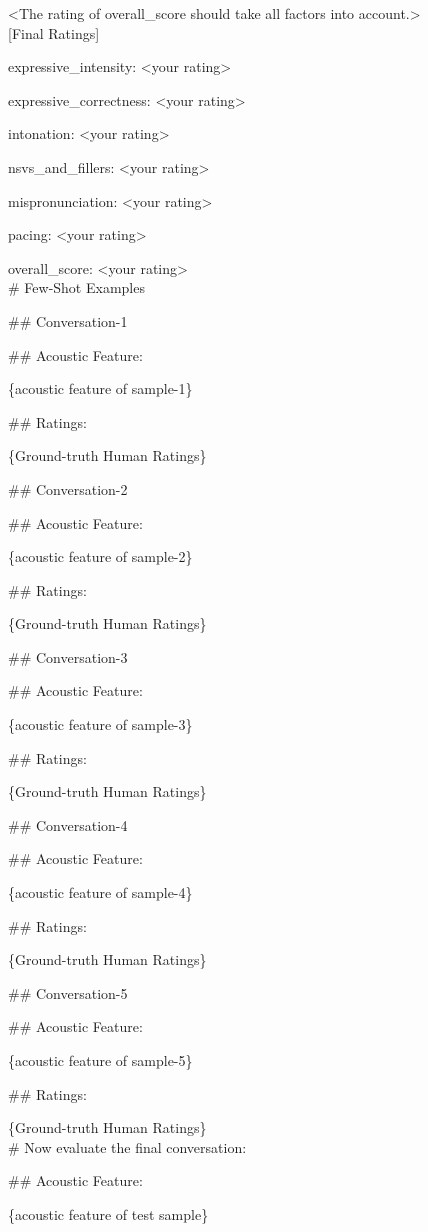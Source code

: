 \begin{tcolorbox}[gray_box, title = {{Prompt Template: Few-shot Acoustic Feature Prompting}}]
<The rating of overall_score should take all factors into account.> \\

[Final Ratings]

expressive_intensity: <your rating>

expressive_correctness: <your rating>

intonation: <your rating>

nsvs_and_fillers: <your rating>

mispronunciation: <your rating>

pacing: <your rating>

overall_score: <your rating> \\

\# Few-Shot Examples

\#\# Conversation-1

\#\# Acoustic Feature:

\{acoustic feature of sample-1\}

\#\# Ratings:

\{Ground-truth Human Ratings\}

\#\# Conversation-2

\#\# Acoustic Feature:

\{acoustic feature of sample-2\}

\#\# Ratings:

\{Ground-truth Human Ratings\}

\#\# Conversation-3

\#\# Acoustic Feature:

\{acoustic feature of sample-3\}

\#\# Ratings:

\{Ground-truth Human Ratings\}

\#\# Conversation-4

\#\# Acoustic Feature:

\{acoustic feature of sample-4\}

\#\# Ratings:

\{Ground-truth Human Ratings\}

\#\# Conversation-5

\#\# Acoustic Feature:

\{acoustic feature of sample-5\}

\#\# Ratings:

\{Ground-truth Human Ratings\} \\

\# Now evaluate the final conversation:

\#\# Acoustic Feature:

\{acoustic feature of test sample\}
\end{tcolorbox}